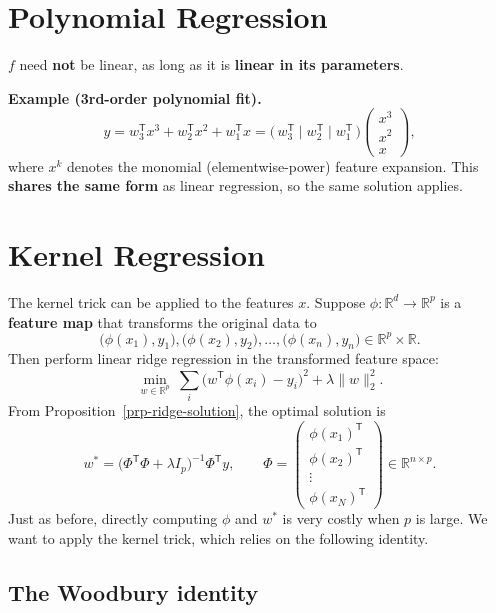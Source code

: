 \documentclass[
  letterpaper,
  DIV=11,
  numbers=noendperiod]{scrreprt}
\theoremstyle{definition}
\theoremstyle{plain}
\theoremstyle{plain}
\theoremstyle{definition}
\theoremstyle{plain}
\theoremstyle{plain}
\theoremstyle{remark}
\begin{document}
\section{Polynomial Regression}\label{polynomial-regression}

\(f\) need \textbf{not} be linear, as long as it is \textbf{linear in
its parameters}.

\textbf{Example (3rd-order polynomial fit).} \[
y = w_3^{\mathsf T} x^3 + w_2^{\mathsf T} x^2 + w_1^{\mathsf T} x
= \big(\, w_3^{\mathsf T} \mid w_2^{\mathsf T} \mid w_1^{\mathsf T} \,\big)
\begin{pmatrix} x^3 \\ x^2 \\ x \end{pmatrix} ,
\] where \(x^k\) denotes the monomial (elementwise-power) feature
expansion. This \textbf{shares the same form} as linear regression, so
the same solution applies.

\section{Kernel Regression}\label{kernel-regression}

The kernel trick can be applied to the features \(x\). Suppose
\(\phi : \mathbb{R}^d \to \mathbb{R}^p\) is a \textbf{feature map} that
transforms the original data to \[
\big(\phi(x_1), y_1\big), \big(\phi(x_2), y_2\big), \dots, \big(\phi(x_n), y_n\big)
\in \mathbb{R}^p \times \mathbb{R} .
\] Then perform linear ridge regression in the transformed feature
space: \[
\min_{w \in \mathbb{R}^p} \ \sum_i \big(w^{\mathsf T} \phi(x_i) - y_i\big)^2 + \lambda \|w\|_2^2 .
\] From Proposition~\ref{prp-ridge-solution}, the optimal solution is \[
w^\ast = \big(\Phi^{\mathsf T}\Phi + \lambda I_p\big)^{-1} \Phi^{\mathsf T} y,
\qquad
\Phi = \begin{pmatrix} \phi(x_1)^{\mathsf T} \\ \phi(x_2)^{\mathsf T} \\ \vdots \\ \phi(x_N)^{\mathsf T} \end{pmatrix}
\in \mathbb{R}^{n \times p} .
\] Just as before, directly computing \(\phi\) and \(w^\ast\) is very
costly when \(p\) is large. We want to apply the kernel trick, which
relies on the following identity.

\subsection{The Woodbury identity}\label{the-woodbury-identity}
\end{document}
